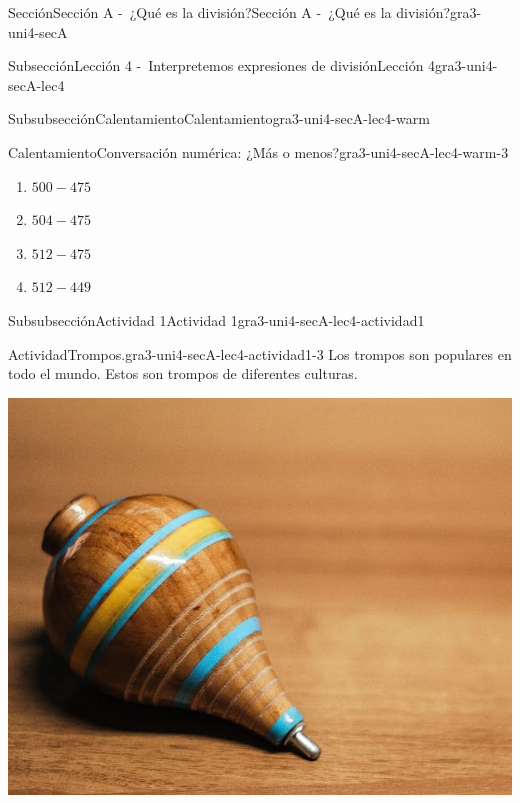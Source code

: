 \documentclass[twoside,10pt,]{article}
\begin{document}
\begin{sectionptx}{Sección}{Sección A -~¿Qué es la división?}{}{Sección A -~¿Qué es la división?}{}{}{gra3-uni4-secA}
\begin{subsectionptx}{Subsección}{Lección 4 -~Interpretemos expresiones de división}{}{Lección 4}{}{}{gra3-uni4-secA-lec4}
\begin{subsubsectionptx}{Subsubsección}{Calentamiento}{}{Calentamiento}{}{}{gra3-uni4-secA-lec4-warm}
\begin{exploration}{Calentamiento}{Conversación numérica: ¿Más o menos?}{gra3-uni4-secA-lec4-warm-3}
\begin{multicols}{2}
\begin{enumerate}
\item{}\(\displaystyle 500 - 475\)%
\item{}\(\displaystyle 504 - 475\)%
\item{}\(\displaystyle 512 - 475\)%
\item{}\(\displaystyle 512 - 449\)%
\end{enumerate}
\end{multicols}
\end{exploration}%
\end{subsubsectionptx}
%
%
\typeout{************************************************}
\typeout{************************************************}
%
\begin{subsubsectionptx}{Subsubsección}{Actividad 1}{}{Actividad 1}{}{}{gra3-uni4-secA-lec4-actividad1}
\begin{activity}{Actividad}{Trompos.}{gra3-uni4-secA-lec4-actividad1-3}%
Los trompos son populares en todo el mundo. Estos son trompos de diferentes culturas.%
\begin{sidebyside}{5}{0}{0}{0}%
\begin{sbspanel}{0.2}%
\includegraphics[width=\linewidth]{external/jpg-source/V1 3.4.A.4 Mexican Trompo.jpg}
\end{sbspanel}%
\begin{sbspanel}{0.2}%

\end{sbspanel}
\end{sidebyside}
\end{activity}
\end{subsubsectionptx}
\end{subsectionptx}
\end{sectionptx}
\end{document}

